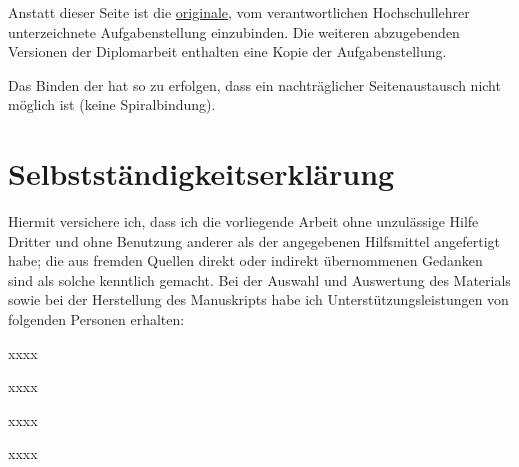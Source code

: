 \documentclass[%
  paper=a4,
  fontsize=12pt,
  twoside=false,
  headsepline=true,
  numbers=noenddot]{scrartcl}
\begin{document}

\onehalfspacing




\cleardoublepage
\thispagestyle{empty} %

\noindent Anstatt dieser Seite ist die \underline{originale}, vom verantwortlichen Hochschullehrer unterzeichnete Aufgabenstellung einzubinden. Die weiteren abzugebenden Versionen der Diplomarbeit enthalten eine Kopie der Aufgabenstellung.

Das Binden der  hat so zu erfolgen, dass ein nachträglicher Seitenaustausch nicht möglich ist (keine Spiralbindung).

\cleardoublepage

%
%


\section*{Selbstständigkeitserklärung}

Hiermit versichere ich, dass ich die vorliegende Arbeit ohne unzulässige Hilfe Dritter und ohne Benutzung anderer als der angegebenen Hilfsmittel angefertigt habe; die aus fremden Quellen direkt oder indirekt übernommenen Gedanken sind als solche kenntlich gemacht. Bei der Auswahl und Auswertung des Materials sowie bei der Herstellung des Manuskripts habe ich Unterstützungsleistungen von folgenden Personen erhalten:

\vspace*{1cm}
\hspace*{2cm}xxxx

\hspace*{2cm}xxxx

\hspace*{2cm}xxxx

\hspace*{2cm}xxxx
\vspace*{1cm}
\end{document}
